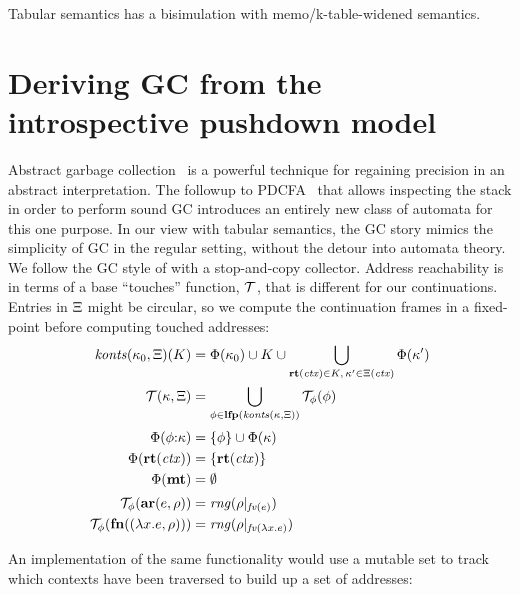 \begin{theorem}\label{thm:global}
  Tabular semantics has a bisimulation with memo/k-table-widened semantics.
\end{theorem}

\section{Deriving GC from the introspective pushdown model}\label{sec:gc}

Abstract garbage collection~\citep{dvanhorn:Might:2006:GammaCFA} is a powerful technique for regaining precision in an abstract interpretation.
%
The followup to PDCFA~\citet{dvanhorn:Earl2012Introspective} that allows inspecting the stack in order to perform sound GC introduces an entirely new class of automata for this one purpose.
%
In our view with tabular semantics, the GC story mimics the simplicity of GC in the regular setting, without the detour into automata theory.
%
We follow the GC style of \citet{dvanhorn:Might:2006:GammaCFA} with a stop-and-copy collector.
%
Address reachability is in terms of a base ``touches'' function, ${\mathcal T}$, that is different for our continuations.
%
Entries in $\Xi$ might be circular, so we compute the continuation frames in a fixed-point before computing touched addresses:
\begin{align*}
  \mathit{konts}(\kappa_0, \Xi)(K) &= \Phi(\kappa_0) \cup K \cup \bigcup\limits_{\mathbf{rt}(\mathit{ctx}) \in K,\, \kappa' \in \Xi(\mathit{ctx})}{\Phi(\kappa')}
\\
  {\mathcal T}(\kappa, \Xi) &= \bigcup\limits_{\phi \in \mathbf{lfp}(\mathit{konts}(\kappa, \Xi))}{{\mathcal T}_{\phi}(\phi)}
\\[2pt]
  \Phi(\phi{\tt :} \kappa) &= \{ \phi \} \cup \Phi(\kappa) \\
  \Phi(\mathbf{rt}(\mathit{ctx})) &= \{ \mathbf{rt}(\mathit{ctx}) \} \\
  \Phi(\mathbf{mt}) &= \emptyset 
\\[2pt]
  {\mathcal T}_{\phi}(\mathbf{ar}{}(e,\rho)) &= \mathit{rng}(\rho|_{\mathit{fv}(e)}) \\
  {\mathcal T}_{\phi}(\mathbf{fn}{}((\lambda{} x. e,\rho))) &= \mathit{rng}(\rho|_{\mathit{fv}(\lambda{} x. e)})
\end{align*}

An implementation of the same functionality would use a mutable set to track which contexts have been traversed to build up a set of addresses:


